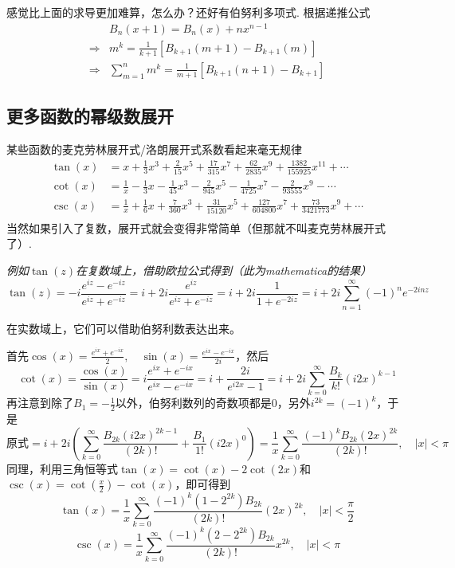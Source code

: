 \documentclass[UTF8]{ctexart}
\newcommand{\trm}[1]{{\rm #1}}
\begin{document}
感觉比上面的求导更加难算，怎么办？还好有伯努利多项式. 根据递推公式
\begin{align*}
    & B_n(x+1) = B_n(x) + nx^{n-1} \\
    \Longrightarrow & m^k = \frac{1}{k+1}\left[B_{k+1}(m+1) - B_{k+1}(m)\right] \\
    \Longrightarrow & \sum_{m=1}^{n} m^k = \frac{1}{m+1}\left[B_{k+1}(n+1) - B_{k+1}\right]
\end{align*}


\subsection{更多函数的幂级数展开}

某些函数的麦克劳林展开式/洛朗展开式系数看起来毫无规律
\begin{align*}
    \tan(x) &= x + \frac{1}{3}x^3 + \frac{2}{15}x^5 + \frac{17}{315}x^7 + \frac{62}{2835}x^9+ \frac{1382}{155925}x^{11} + \cdots \\
    \cot(x) &= \frac{1}{x} - \frac{1}{3}x - \frac{1}{45}x^3 - \frac{2}{945}x^5 - \frac{1}{4725}x^7 - \frac{2}{93555}x^9 - \cdots \\
    \csc(x) &= \frac{1}{x} + \frac{1}{6}x + \frac{7}{360}x^3 + \frac{31}{15120}x^5 + \frac{127}{604800}x^7 + \frac{73}{3421773}x^9 + \cdots \\
\end{align*}
当然如果引入了复数，展开式就会变得非常简单（但那就不叫麦克劳林展开式了）.

\vspace{0.5cm}
\textit{
例如\(\tan(z)\)在复数域上，借助欧拉公式得到（此为\trm{mathematica}的结果）
\[ \tan(z) = -i\frac{e^{iz}-e^{-iz}}{e^{iz}+e^{-iz}} = i+2i\frac{e^{iz}}{e^{iz}+e^{-iz}}=i+2i\frac{1}{1+e^{-2iz}}=i+2i\sum_{n=1}^{\infty}(-1)^ne^{-2inz}\]
}

在实数域上，它们可以借助伯努利数表达出来。

首先\(\displaystyle{\cos(x) = \frac{e^{ix}+e^{-ix}}2, \quad \sin(x) = \frac{e^{ix}-e^{-ix}}{2i}}\)，然后
\[ \cot(x) = \frac{\cos(x)}{\sin(x)} = i\frac{e^{ix} + e^{-ix}}{e^{ix} - e^{-ix}} = i + \frac{2i}{e^{i2x} - 1} = i+2i\sum_{k=0}^{\infty}\frac{B_k}{k!}(i2x)^{k-1}\]
再注意到除了\(B_1=-\frac{1}{2}\)以外，伯努利数列的奇数项都是0，另外\(i^{2k} = (-1)^k\)，于是
\[ \mbox{原式}= i + 2i\left(\sum_{k=0}^{\infty}\frac{B_{2k}(i2x)^{2k-1}}{(2k)!}+\frac{B_1}{1!}(i2x)^0 \right) = \frac{1}{x}\sum_{k=0}^{\infty}\frac{(-1)^k B_{2k} (2x)^{2k}}{(2k)!}, \quad |x|<{\pi}\]
同理，利用三角恒等式\(\tan(x) = \cot(x) - 2\cot(2x)\)和\(\csc(x) = \cot\left(\frac{x}{2}\right)-\cot(x)\)，即可得到
\[ \tan(x)=\frac{1}{x}\sum_{k=0}^{\infty}\frac{(-1)^{k}(1-2^{2k})B_{2k}}{(2k)!}(2x)^{2k}, \quad |x|<\frac {\pi}{2}\]
\[\csc(x)=\frac{1}{x}\sum_{k=0}^{\infty}\frac{(-1)^{k}(2-2^{2k})B_{2k}}{(2k)!}x^{2k}, \quad |x|<\pi \]
\end{document}
